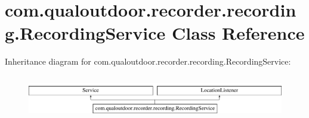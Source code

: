 \hypertarget{classcom_1_1qualoutdoor_1_1recorder_1_1recording_1_1RecordingService}{\section{com.\-qualoutdoor.\-recorder.\-recording.\-Recording\-Service Class Reference}
\label{classcom_1_1qualoutdoor_1_1recorder_1_1recording_1_1RecordingService}
}
Inheritance diagram for com.\-qualoutdoor.\-recorder.\-recording.\-Recording\-Service\-:\begin{figure}[H]
\begin{center}
\leavevmode
\includegraphics[height=2.000000cm]{classcom_1_1qualoutdoor_1_1recorder_1_1recording_1_1RecordingService}
\end{center}
\end{figure}
